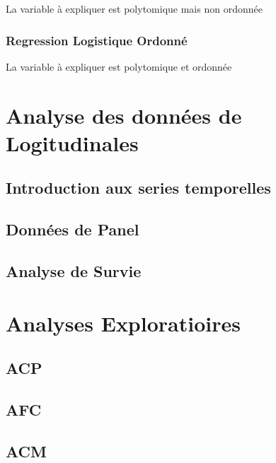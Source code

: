 \documentclass[
]{book}
\begin{document}
La variable à expliquer est polytomique mais non ordonnée

\hypertarget{regression-logistique-ordonnuxe9}{%
\subsection{Regression Logistique Ordonné}\label{regression-logistique-ordonnuxe9}}

La variable à expliquer est polytomique et ordonnée

\hypertarget{analyse-des-donnuxe9es-de-logitudinales}{%
\chapter{Analyse des données de Logitudinales}\label{analyse-des-donnuxe9es-de-logitudinales}}

\hypertarget{introduction-aux-series-temporelles}{%
\section{Introduction aux series temporelles}\label{introduction-aux-series-temporelles}}

\hypertarget{donnuxe9es-de-panel}{%
\section{Données de Panel}\label{donnuxe9es-de-panel}}

\hypertarget{analyse-de-survie}{%
\section{Analyse de Survie}\label{analyse-de-survie}}

\hypertarget{analyses-exploratioires}{%
\chapter{Analyses Exploratioires}\label{analyses-exploratioires}}

\hypertarget{acp}{%
\section{ACP}\label{acp}}

\hypertarget{afc}{%
\section{AFC}\label{afc}}

\hypertarget{acm}{%
\section{ACM}\label{acm}}

  
\end{document}

